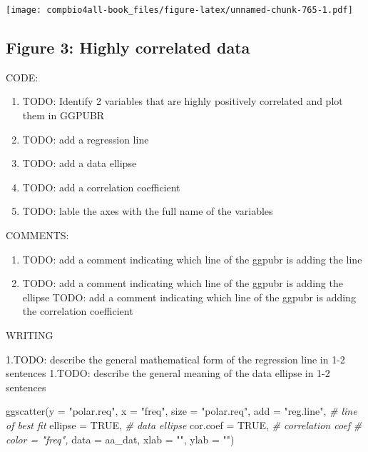 \documentclass[
]{book}
\newenvironment{Shaded}{\begin{snugshade}}{\end{snugshade}}
\newcommand{\AttributeTok}[1]{\textcolor[rgb]{0.77,0.63,0.00}{#1}}
\newcommand{\CommentTok}[1]{\textcolor[rgb]{0.56,0.35,0.01}{\textit{#1}}}
\newcommand{\ConstantTok}[1]{\textcolor[rgb]{0.00,0.00,0.00}{#1}}
\newcommand{\FunctionTok}[1]{\textcolor[rgb]{0.00,0.00,0.00}{#1}}
\newcommand{\NormalTok}[1]{#1}
\newcommand{\StringTok}[1]{\textcolor[rgb]{0.31,0.60,0.02}{#1}}
\providecommand{\tightlist}{%
  \setlength{\itemsep}{0pt}\setlength{\parskip}{0pt}}
\begin{document}
\texttt{[image: compbio4all-book\_files/figure-latex/unnamed-chunk-765-1.pdf]}

\hypertarget{figure-3-highly-correlated-data}{%
\subsection{Figure 3: Highly correlated data}\label{figure-3-highly-correlated-data}}

CODE:

\begin{enumerate}
\def\labelenumi{\arabic{enumi}.}
\tightlist
\item
  TODO: Identify 2 variables that are highly positively correlated and plot them in GGPUBR
\item
  TODO: add a regression line
\item
  TODO: add a data ellipse
\item
  TODO: add a correlation coefficient
\item
  TODO: lable the axes with the full name of the variables
\end{enumerate}

COMMENTS:

\begin{enumerate}
\def\labelenumi{\arabic{enumi}.}
\tightlist
\item
  TODO: add a comment indicating which line of the ggpubr is adding the line
\item
  TODO: add a comment indicating which line of the ggpubr is adding the ellipse
  TODO: add a comment indicating which line of the ggpubr is adding the correlation coefficient
\end{enumerate}

WRITING

1.TODO: describe the general mathematical form of the regression line in 1-2 sentences
1.TODO: describe the general meaning of the data ellipse in 1-2 sentences

\begin{Shaded}
\begin{Highlighting}[]
\FunctionTok{ggscatter}\NormalTok{(}\AttributeTok{y =} \StringTok{"polar.req"}\NormalTok{,}
          \AttributeTok{x =} \StringTok{"freq"}\NormalTok{,}
          \AttributeTok{size =} \StringTok{"polar.req"}\NormalTok{,}
           \AttributeTok{add =} \StringTok{"reg.line"}\NormalTok{,  }\CommentTok{\# line of best fit}
           \AttributeTok{ellipse =} \ConstantTok{TRUE}\NormalTok{,   }\CommentTok{\# data ellipse}
          \AttributeTok{cor.coef =} \ConstantTok{TRUE}\NormalTok{, }\CommentTok{\# correlation coef}
         \CommentTok{\# color = "freq",}
          \AttributeTok{data =}\NormalTok{ aa\_dat,}
         \AttributeTok{xlab =} \StringTok{""}\NormalTok{,}
         \AttributeTok{ylab =} \StringTok{""}\NormalTok{)}
\end{Highlighting}
\end{Shaded}
\end{document}
